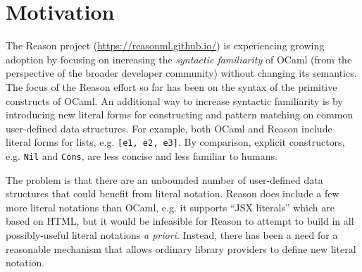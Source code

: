 \documentclass[acmsmall]{acmart}
\newcommand{\li}[1]{\lstinline[basicstyle=\ttfamily\fontsize{9pt}{1em}\selectfont]{#1}}
\theoremstyle{slplain}
\numberwithin{thm}{section}
\begin{document}




\maketitle
\thispagestyle{empty} %

\section{Motivation}

The Reason project (\url{https://reasonml.github.io/}) is experiencing growing adoption by focusing on increasing the \emph{syntactic familiarity} of OCaml (from the perspective of the broader developer community) without changing its semantics. The focus of the Reason effort so far has been on the syntax of the primitive constructs of OCaml. An additional way to increase syntactic familiarity is by introducing new {literal forms} for constructing and pattern matching on  common user-defined data structures. For example, both OCaml and Reason include literal forms for lists, e.g. \li{[e1, e2, e3]}. By comparison, explicit constructors, e.g. \li{Nil} and \li{Cons}, are less concise and less familiar to humans.

The problem is that there are an  unbounded number of user-defined data structures that could benefit from literal notation. Reason does include a few more literal notations than OCaml, e.g. it supports ``JSX literals'' which are based on HTML, but it would be infeasible for Reason to attempt to build in all possibly-useful literal notations \emph{a priori}. Instead, there has been a need for a reasonable mechanism that allows ordinary library providers to define new literal notation.
\end{document}
